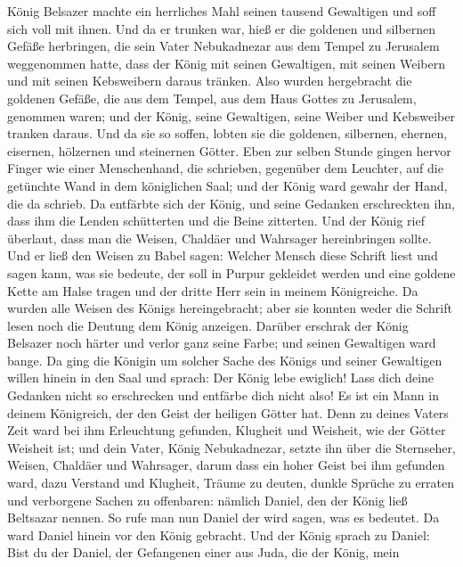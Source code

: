  König Belsazer machte ein herrliches Mahl seinen tausend
Gewaltigen und soff sich voll mit ihnen.  Und da er
trunken war, hieß er die goldenen und silbernen Gefäße herbringen, die
sein Vater Nebukadnezar aus dem Tempel zu Jerusalem weggenommen hatte,
dass der König mit seinen Gewaltigen, mit seinen Weibern und mit seinen
Kebsweibern daraus tränken.  Also wurden hergebracht die
goldenen Gefäße, die aus dem Tempel, aus dem Haus Gottes zu Jerusalem,
genommen waren; und der König, seine Gewaltigen, seine Weiber und
Kebsweiber tranken daraus.  Und da sie so soffen, lobten
sie die goldenen, silbernen, ehernen, eisernen, hölzernen und steinernen
Götter.  Eben zur selben Stunde gingen hervor Finger wie
einer Menschenhand, die schrieben, gegenüber dem Leuchter, auf die
getünchte Wand in dem königlichen Saal; und der König ward gewahr der
Hand, die da schrieb.  Da entfärbte sich der König, und
seine Gedanken erschreckten ihn, dass ihm die Lenden schütterten und die
Beine zitterten.  Und der König rief überlaut, dass man
die Weisen, Chaldäer und Wahrsager hereinbringen sollte. Und er ließ den
Weisen zu Babel sagen: Welcher Mensch diese Schrift liest und sagen
kann, was sie bedeute, der soll in Purpur gekleidet werden und eine
goldene Kette am Halse tragen und der dritte Herr sein in meinem
Königreiche.  Da wurden alle Weisen des Königs
hereingebracht; aber sie konnten weder die Schrift lesen noch die
Deutung dem König anzeigen.  Darüber erschrak der König
Belsazer noch härter und verlor ganz seine Farbe; und seinen Gewaltigen
ward bange.  Da ging die Königin um solcher Sache des
Königs und seiner Gewaltigen willen hinein in den Saal und sprach: Der
König lebe ewiglich! Lass dich deine Gedanken nicht so erschrecken und
entfärbe dich nicht also!  Es ist ein Mann in deinem
Königreich, der den Geist der heiligen Götter hat. Denn zu deines Vaters
Zeit ward bei ihm Erleuchtung gefunden, Klugheit und Weisheit, wie der
Götter Weisheit ist; und dein Vater, König Nebukadnezar, setzte ihn über
die Sternseher, Weisen, Chaldäer und Wahrsager,  darum
dass ein hoher Geist bei ihm gefunden ward, dazu Verstand und Klugheit,
Träume zu deuten, dunkle Sprüche zu erraten und verborgene Sachen zu
offenbaren: nämlich Daniel, den der König ließ Beltsazar nennen. So rufe
man nun Daniel der wird sagen, was es bedeutet.  Da ward
Daniel hinein vor den König gebracht. Und der König sprach zu Daniel:
Bist du der Daniel, der Gefangenen einer aus Juda, die der König, mein
